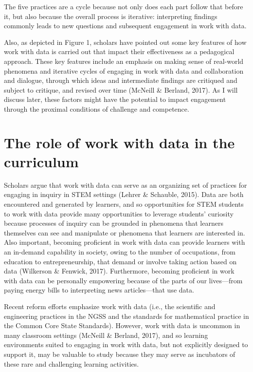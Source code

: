 \documentclass[]{msu-thesis}
\theoremstyle{definition}
\theoremstyle{definition}
\theoremstyle{definition}
\theoremstyle{remark}
\begin{document}
The five practices are a cycle because not only does each part follow
that before it, but also because the overall process is iterative:
interpreting findings commonly leads to new questions and subsequent
engagement in work with data.

Also, as depicted in Figure 1, scholars have pointed out some key
features of how work with data is carried out that impact their
effectiveness as a pedagogical approach. These key features include an
emphasis on making sense of real-world phenomena and iterative cycles of
engaging in work with data and collaboration and dialogue, through which
ideas and intermediate findings are critiqued and subject to critique,
and revised over time (McNeill \& Berland, 2017). As I will discuss
later, these factors might have the potential to impact engagement
through the proximal conditions of challenge and competence.

\section{The role of work with data in the
curriculum}\label{the-role-of-work-with-data-in-the-curriculum}

Scholars argue that work with data can serve as an organizing set of
practices for engaging in inquiry in STEM settings (Lehrer \& Schauble,
2015). Data are both encountered and generated by learners, and so
opportunities for STEM students to work with data provide many
opportunities to leverage students' curiosity because processes of
inquiry can be grounded in phenomena that learners themselves can see
and manipulate or phenomena that learners are interested in. Also
important, becoming proficient in work with data can provide learners
with an in-demand capability in society, owing to the number of
occupations, from education to entrepreneurship, that demand or involve
taking action based on data (Wilkerson \& Fenwick, 2017). Furthermore,
becoming proficient in work with data can be personally empowering
because of the parts of our lives---from paying energy bills to
interpreting news articles---that use data.

Recent reform efforts emphasize work with data (i.e., the scientific and
engineering practices in the NGSS and the standards for mathematical
practice in the Common Core State Standards). However, work with data is
uncommon in many classroom settings (McNeill \& Berland, 2017), and so
learning environments suited to engaging in work with data, but not
explicitly designed to support it, may be valuable to study because they
may serve as incubators of these rare and challenging learning
activities.
\end{document}
